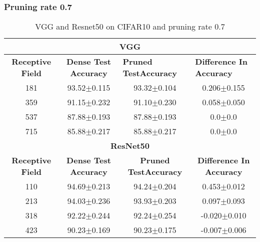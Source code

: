 \subsubsection*{Pruning rate 0.7}
\begin{table}[H]
\begin{tabular}{@{}cccc@{}}
\toprule
\multicolumn{4}{c}{\textbf{VGG}}                                                                                                                                  \\ \midrule
\textbf{Receptive Field} & \textbf{Dense Test Accuracy} & \multicolumn{1}{l}{\textbf{Pruned  TestAccuracy}} & \multicolumn{1}{l}{\textbf{Difference In Accuracy}} \\ \midrule
181                      & 93.52$\pm$0.115              & 93.32$\pm$0.104                                   & 0.206$\pm$0.155                                     \\
359                      & 91.15$\pm$0.232              & 91.10$\pm$0.230                                   & 0.058$\pm$0.050                                     \\
537                      & 87.88$\pm$0.193              & 87.88$\pm$0.193                                   & 0.0$\pm$0.0                                         \\
715                      & 85.88$\pm$0.217              & 85.88$\pm$0.217                                   & 0.0$\pm$0.0                                         \\ \midrule
\multicolumn{4}{c}{\textbf{ResNet50}}                                                                                                                             \\ \midrule
\textbf{Receptive Field} & \textbf{Dense Test Accuracy} & \textbf{Pruned  TestAccuracy}                     & \textbf{Difference In Accuracy}                     \\
110                      & 94.69$\pm$0.213              & 94.24$\pm$0.204                                   & 0.453$\pm$0.012                                     \\
213                      & 94.03$\pm$0.236              & 93.93$\pm$0.203                                   & 0.097$\pm$0.093                                     \\
318                      & 92.22$\pm$0.244              & 92.24$\pm$0.254                                   & -0.020$\pm$0.010                                    \\
423                      & 90.23$\pm$0.169              & 90.23$\pm$0.175                                   & -0.007$\pm$0.006                                    \\ \bottomrule
\end{tabular}
\caption{VGG and Resnet50 on CIFAR10 and pruning rate 0.7}
\label{tab:cifar10 pruning rate07}
\end{table}

